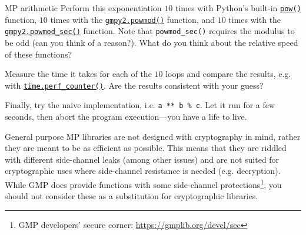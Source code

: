 \documentclass{practice}
\begin{document}
\begin{task}{MP arithmetic}
  Perform this exponentiation $10$ times with Python's built-in \href{https://docs.python.org/3/library/functions.html#pow}{\texttt{pow()}} function, $10$ times with the \href{https://gmpy2.readthedocs.io/en/latest/mpz.html#gmpy2.powmod}{\texttt{gmpy2.powmod()}} function, and $10$ times with the \href{https://gmpy2.readthedocs.io/en/latest/mpz.html#gmpy2.powmod_sec}{\texttt{gmpy2.powmod\_sec()}} function.
  Note that \texttt{powmod\_sec()} requires the modulus to be odd (can you think of a reason?).
  What do you think about the relative speed of these functions?

  Measure the time it takes for each of the $10$ loops and compare the results, e.g. with \href{https://docs.python.org/3/library/time.html#time.perf_counter}{\texttt{time.perf\_counter()}}.
  Are the results consistent with your guess?

  Finally, try the naive implementation, i.e. \texttt{a ** b \% c}.
  Let it run for a few seconds, then abort the program execution---you have a life to live.

  \begin{tcolorbox}[title=Warning]
    General purpose MP libraries are not designed with cryptography in mind, rather they are meant to be as efficient as possible.
    This means that they are riddled with different side-channel leaks (among other issues) and are not suited for cryptographic uses where side-channel resistance is needed (e.g. decryption).
    \tcblower
    While GMP does provide functions with some side-channel protections\footnote{GMP developers' secure corner: \url{https://gmplib.org/devel/sec}}, you should not consider these as a substitution for cryptographic libraries.
  \end{tcolorbox}
\end{task}
\end{document}
